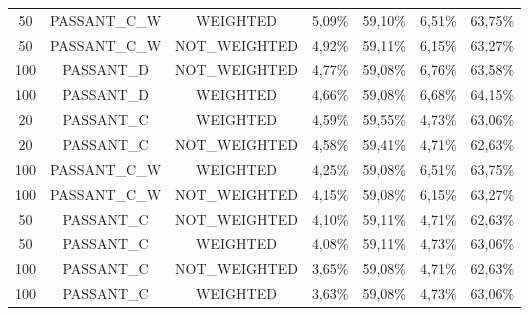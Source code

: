 \begin{table}[H]
{\begin{tabular}{ccccccc}
			50 & PASSANT\_C\_W &   WEIGHTED &     5,09\% &    59,10\% &     6,51\% &    63,75\% \\
			
			50 & PASSANT\_C\_W & NOT\_WEIGHTED &     4,92\% &    59,11\% &     6,15\% &    63,27\% \\
			
			100 &  PASSANT\_D & NOT\_WEIGHTED &     4,77\% &    59,08\% &     6,76\% &    63,58\% \\
			
			100 &  PASSANT\_D &   WEIGHTED &     4,66\% &    59,08\% &     6,68\% &    64,15\% \\
			
			20 &  PASSANT\_C &   WEIGHTED &     4,59\% &    59,55\% &     4,73\% &    63,06\% \\
			
			20 &  PASSANT\_C & NOT\_WEIGHTED &     4,58\% &    59,41\% &     4,71\% &    62,63\% \\
			
			100 & PASSANT\_C\_W &   WEIGHTED &     4,25\% &    59,08\% &     6,51\% &    63,75\% \\
			
			100 & PASSANT\_C\_W & NOT\_WEIGHTED &     4,15\% &    59,08\% &     6,15\% &    63,27\% \\
			
			50 &  PASSANT\_C & NOT\_WEIGHTED &     4,10\% &    59,11\% &     4,71\% &    62,63\% \\
			
			50 &  PASSANT\_C &   WEIGHTED &     4,08\% &    59,11\% &     4,73\% &    63,06\% \\
			
			100 &  PASSANT\_C & NOT\_WEIGHTED &     3,65\% &    59,08\% &     4,71\% &    62,63\% \\
			
			100 &  PASSANT\_C &   WEIGHTED &     3,63\% &    59,08\% &     4,73\% &    63,06\% \\
			
		\end{tabular}  		 	
	}
\end{table}

